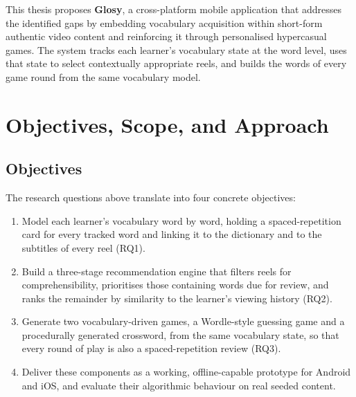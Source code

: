 This thesis proposes \textbf{Glosy}, a cross-platform mobile application that addresses the identified gaps by embedding vocabulary acquisition within short-form authentic video content and reinforcing it through personalised hypercasual games. The system tracks each learner's vocabulary state at the word level, uses that state to select contextually appropriate reels, and builds the words of every game round from the same vocabulary model.


\section{Objectives, Scope, and Approach}
\label{sec:objectives_scope}

    \subsection{Objectives}
    The research questions above translate into four concrete objectives:

    \begin{enumerate}
        \item[\textbf{O1.}] Model each learner's vocabulary word by word, holding a spaced-repetition card for every tracked word and linking it to the dictionary and to the subtitles of every reel (RQ1).

        \item[\textbf{O2.}] Build a three-stage recommendation engine that filters reels for comprehensibility, prioritises those containing words due for review, and ranks the remainder by similarity to the learner's viewing history (RQ2).

        \item[\textbf{O3.}] Generate two vocabulary-driven games, a Wordle-style guessing game and a procedurally generated crossword, from the same vocabulary state, so that every round of play is also a spaced-repetition review (RQ3).
        
        \item[\textbf{O4.}] Deliver these components as a working, offline-capable prototype for Android and iOS, and evaluate their algorithmic behaviour on real seeded content.
    \end{enumerate}

